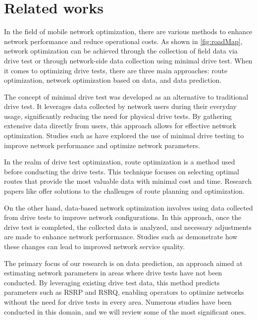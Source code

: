 \section{Related works}
\label{sec:RelatedWorks}
In the field of mobile network optimization, there are various methods to enhance network performance and reduce operational costs. As shown in \autoref{fig:roadMap}, network optimization can be achieved through the collection of field data via drive test or through network-side data collection using minimal drive test. When it comes to optimizing drive tests, there are three main approaches: route optimization, network optimization based on data, and data prediction.

The concept of minimal drive test was developed as an alternative to traditional drive test. It leverages data collected by network users during their everyday usage, significantly reducing the need for physical drive tests. By gathering extensive data directly from users, this approach allows for effective network optimization. Studies such as \cite{SKOCAJ2022403,9017353} have explored the use of minimal drive testing to improve network performance and optimize network parameters.

In the realm of drive test optimization, route optimization is a method used before conducting the drive tests. This technique focuses on selecting optimal routes that provide the most valuable data with minimal cost and time. Research papers like \cite{Christofides1986,ARAOZ2009886} offer solutions to the challenges of route planning and optimization.

On the other hand, data-based network optimization involves using data collected from drive tests to improve network configurations. In this approach, once the drive test is completed, the collected data is analyzed, and necessary adjustments are made to enhance network performance. Studies such as \cite{silalahi2021improvement,Peerajing2016Multisector} demonstrate how these changes can lead to improved network service quality.

The primary focus of our research is on data prediction, an approach aimed at estimating network parameters in areas where drive tests have not been conducted. By leveraging existing drive test data, this method predicts parameters such as \gls{RSRP} and \gls{RSRQ}, enabling operators to optimize networks without the need for drive tests in every area. Numerous studies have been conducted in this domain, and we will review some of the most significant ones.

